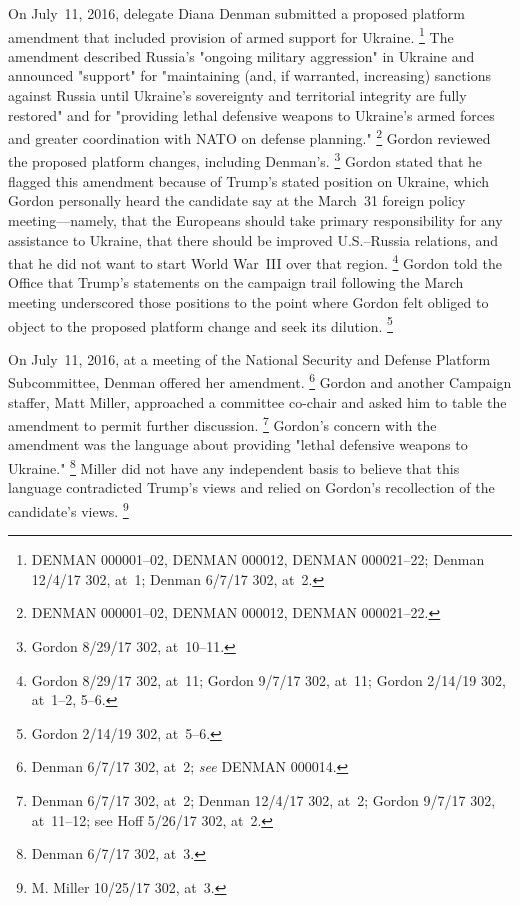 On July~11, 2016, delegate Diana Denman submitted a proposed platform amendment that included provision of armed support for Ukraine.%
\footnote{DENMAN 000001--02, DENMAN 000012, DENMAN 000021--22;
Denman 12/4/17 302, at~1;
Denman 6/7/17 302, at~2.}
The amendment described Russia's "ongoing military aggression" in Ukraine and announced "support" for "maintaining (and, if warranted, increasing) sanctions against Russia until Ukraine's sovereignty and territorial integrity are fully restored" and for "providing lethal defensive weapons to Ukraine's armed forces and greater coordination with NATO on defense planning."%
\footnote{DENMAN 000001--02, DENMAN 000012, DENMAN 000021--22.}
Gordon reviewed the proposed platform changes, including Denman's.%
\footnote{Gordon 8/29/17 302, at~10--11.}
Gordon stated that he flagged this amendment because of Trump's stated position on Ukraine, which Gordon personally heard the candidate say at the March~31 foreign policy meeting---namely, that the Europeans should take primary responsibility for any assistance to Ukraine, that there should be improved U.S.--Russia relations, and that he did not want to start World War~III over that region.%
\footnote{Gordon 8/29/17 302, at~11;
Gordon 9/7/17 302, at~11;
Gordon 2/14/19 302, at~1--2, 5--6.}
Gordon told the Office that Trump's statements on the campaign trail following the March meeting underscored those positions to the point where Gordon felt obliged to object to the proposed platform change and seek its dilution.%
\footnote{Gordon 2/14/19 302, at~5--6.}

On July~11, 2016, at a meeting of the National Security and Defense Platform Subcommittee, Denman offered her amendment.%
\footnote{Denman 6/7/17 302, at~2;
\textit{see} DENMAN 000014.}
Gordon and another Campaign staffer, Matt Miller, approached a committee co-chair and asked him to table the amendment to permit further discussion.%
\footnote{Denman 6/7/17 302, at~2;
Denman 12/4/17 302, at~2;
Gordon 9/7/17 302, at~11--12;
see Hoff 5/26/17 302, at~2.}
Gordon's concern with the amendment was the language about providing "lethal defensive weapons to Ukraine."%
\footnote{Denman 6/7/17 302, at~3.}
Miller did not have any independent basis to believe that this language contradicted Trump's views and relied on Gordon's recollection of the candidate's views.%
\footnote{M. Miller 10/25/17 302, at~3.}

